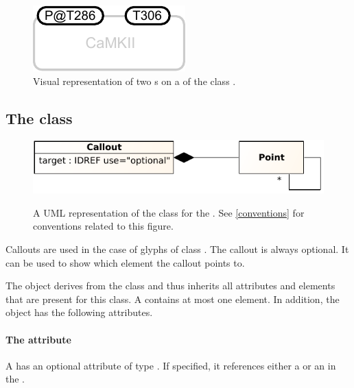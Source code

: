 \begin{figure}[!ht]
  \centering
  \includegraphics[scale=0.9]{figures/state_example.pdf}
\caption{Visual representation of two \State{}s on a \Glyph of the class .}
  \label{fig:state_example}
\end{figure}


\subsection{The  class}
\label{callout-class}

\begin{figure}[ht!]
  \centering
  \includegraphics[scale=1.0]{figures/sbgnml_callout_uml.pdf}\\
\caption{A UML representation of the \Callout class for the
\SbgnmlPackage. See \ref{conventions} for conventions related to this
figure. }
  \label{fig:sbgnml_callout_uml}
\end{figure}


Callouts are used in the case of glyphs of class . The callout is always optional. It can be used to show which element the callout points to.

The \Callout object derives from the \SbgnBase class and thus inherits all
attributes and elements that are present for this class.
A \Callout contains at most one \Point element.
In addition, the \Callout object has the following attributes.

\paragraph{The \fixttspace{} attribute}

A \Callout has an optional attribute  of type
. If specified, it references either a \Glyph or an \Arc in the \Map. 

